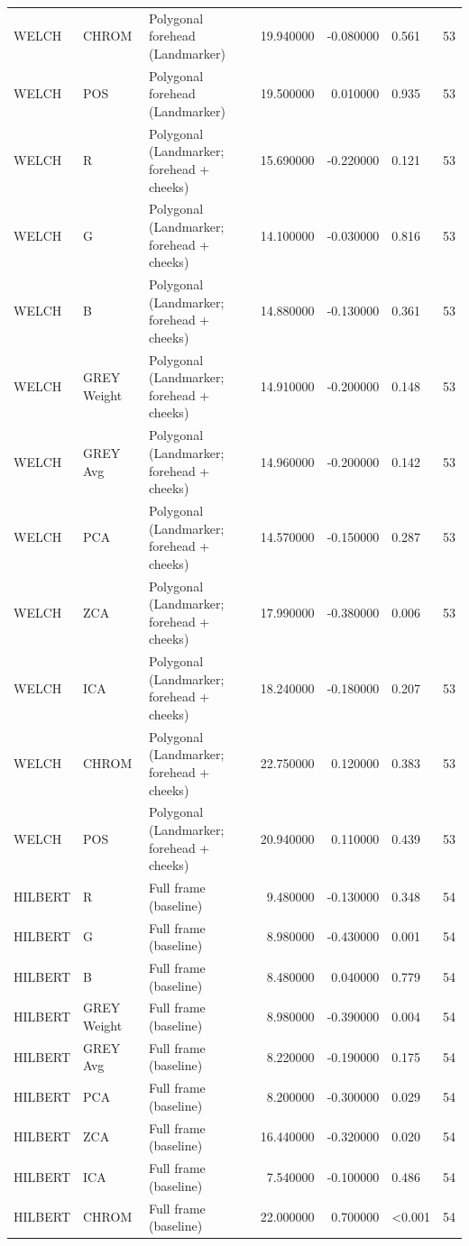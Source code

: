 \begin{table}[htbp]
\begin{tabular}{l l l r r l r}
WELCH & CHROM & Polygonal forehead (Landmarker) & 19.940000 & -0.080000 & 0.561 & 53 \\
WELCH & POS & Polygonal forehead (Landmarker) & 19.500000 & 0.010000 & 0.935 & 53 \\
WELCH & R & Polygonal (Landmarker; forehead + cheeks) & 15.690000 & -0.220000 & 0.121 & 53 \\
WELCH & G & Polygonal (Landmarker; forehead + cheeks) & 14.100000 & -0.030000 & 0.816 & 53 \\
WELCH & B & Polygonal (Landmarker; forehead + cheeks) & 14.880000 & -0.130000 & 0.361 & 53 \\
WELCH & GREY Weight & Polygonal (Landmarker; forehead + cheeks) & 14.910000 & -0.200000 & 0.148 & 53 \\
WELCH & GREY Avg & Polygonal (Landmarker; forehead + cheeks) & 14.960000 & -0.200000 & 0.142 & 53 \\
WELCH & PCA & Polygonal (Landmarker; forehead + cheeks) & 14.570000 & -0.150000 & 0.287 & 53 \\
WELCH & ZCA & Polygonal (Landmarker; forehead + cheeks) & 17.990000 & -0.380000 & 0.006 & 53 \\
WELCH & ICA & Polygonal (Landmarker; forehead + cheeks) & 18.240000 & -0.180000 & 0.207 & 53 \\
WELCH & CHROM & Polygonal (Landmarker; forehead + cheeks) & 22.750000 & 0.120000 & 0.383 & 53 \\
WELCH & POS & Polygonal (Landmarker; forehead + cheeks) & 20.940000 & 0.110000 & 0.439 & 53 \\
HILBERT & R & Full frame (baseline) & 9.480000 & -0.130000 & 0.348 & 54 \\
HILBERT & G & Full frame (baseline) & 8.980000 & -0.430000 & 0.001 & 54 \\
HILBERT & B & Full frame (baseline) & 8.480000 & 0.040000 & 0.779 & 54 \\
HILBERT & GREY Weight & Full frame (baseline) & 8.980000 & -0.390000 & 0.004 & 54 \\
HILBERT & GREY Avg & Full frame (baseline) & 8.220000 & -0.190000 & 0.175 & 54 \\
HILBERT & PCA & Full frame (baseline) & 8.200000 & -0.300000 & 0.029 & 54 \\
HILBERT & ZCA & Full frame (baseline) & 16.440000 & -0.320000 & 0.020 & 54 \\
HILBERT & ICA & Full frame (baseline) & 7.540000 & -0.100000 & 0.486 & 54 \\
HILBERT & CHROM & Full frame (baseline) & 22.000000 & 0.700000 & <0.001 & 54 \\

\end{tabular}
\end{table}
